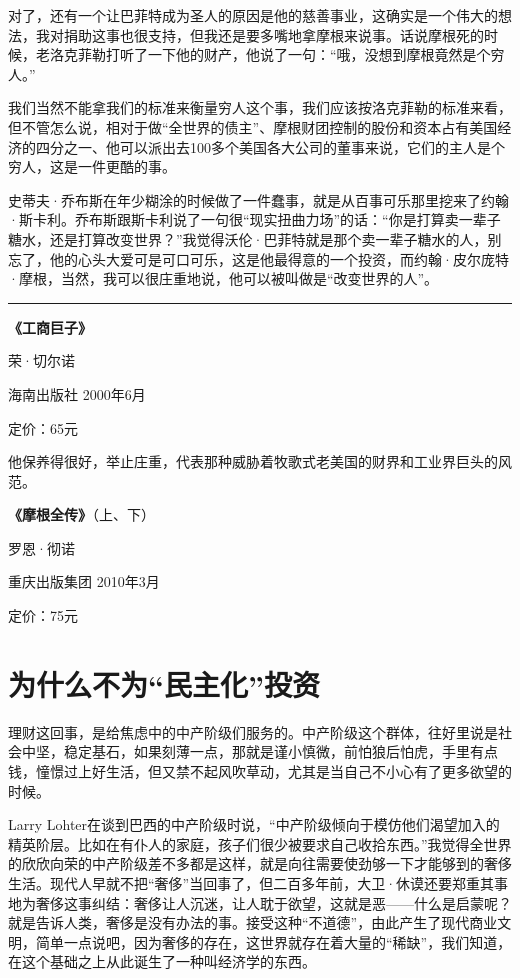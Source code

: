 对了，还有一个让巴菲特成为圣人的原因是他的慈善事业，这确实是一个伟大的想法，我对捐助这事也很支持，但我还是要多嘴地拿摩根来说事。话说摩根死的时候，老洛克菲勒打听了一下他的财产，他说了一句：``哦，没想到摩根竟然是个穷人。''

我们当然不能拿我们的标准来衡量穷人这个事，我们应该按洛克菲勒的标准来看，但不管怎么说，相对于做``全世界的债主''、摩根财团控制的股份和资本占有美国经济的四分之一、他可以派出去100多个美国各大公司的董事来说，它们的主人是个穷人，这是一件更酷的事。

史蒂夫·乔布斯在年少糊涂的时候做了一件蠢事，就是从百事可乐那里挖来了约翰·斯卡利。乔布斯跟斯卡利说了一句很``现实扭曲力场''的话：``你是打算卖一辈子糖水，还是打算改变世界？''我觉得沃伦·巴菲特就是那个卖一辈子糖水的人，别忘了，他的心头大爱可是可口可乐，这是他最得意的一个投资，而约翰·皮尔庞特·摩根，当然，我可以很庄重地说，他可以被叫做是``改变世界的人''。

\begin{center}\rule{0.5\linewidth}{0.5pt}\end{center}

\textbf{《工商巨子》}

荣·切尔诺

海南出版社 2000年6月

定价：65元

他保养得很好，举止庄重，代表那种威胁着牧歌式老美国的财界和工业界巨头的风范。

\textbf{《摩根全传》}（上、下）

罗恩·彻诺

重庆出版集团 2010年3月

定价：75元

\hypertarget{ux4e3aux4ec0ux4e48ux4e0dux4e3aux6c11ux4e3bux5316ux6295ux8d44}{%
\section{为什么不为``民主化''投资}\label{ux4e3aux4ec0ux4e48ux4e0dux4e3aux6c11ux4e3bux5316ux6295ux8d44}}

理财这回事，是给焦虑中的中产阶级们服务的。中产阶级这个群体，往好里说是社会中坚，稳定基石，如果刻薄一点，那就是谨小慎微，前怕狼后怕虎，手里有点钱，憧憬过上好生活，但又禁不起风吹草动，尤其是当自己不小心有了更多欲望的时候。

Larry
Lohter在谈到巴西的中产阶级时说，``中产阶级倾向于模仿他们渴望加入的精英阶层。比如在有仆人的家庭，孩子们很少被要求自己收拾东西。''我觉得全世界的欣欣向荣的中产阶级差不多都是这样，就是向往需要使劲够一下才能够到的奢侈生活。现代人早就不把``奢侈''当回事了，但二百多年前，大卫·休谟还要郑重其事地为奢侈这事纠结：奢侈让人沉迷，让人耽于欲望，这就是恶------什么是启蒙呢？就是告诉人类，奢侈是没有办法的事。接受这种``不道德''，由此产生了现代商业文明，简单一点说吧，因为奢侈的存在，这世界就存在着大量的``稀缺''，我们知道，在这个基础之上从此诞生了一种叫经济学的东西。

